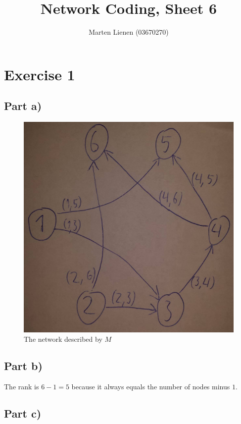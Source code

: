 \documentclass[10pt,a4paper]{article}
\title{Network Coding, Sheet 6}
\author{Marten Lienen (03670270)}
\begin{document}
\maketitle

\section*{Exercise 1}

\subsection*{Part a)}

\begin{figure}[h]
  \centering
  \includegraphics[width=\textwidth]{sheet-6/exercise-1-a}
  \caption{The network described by $M$}
\end{figure}

\subsection*{Part b)}

The rank is $6 - 1 = 5$ because it always equals the number of nodes minus $1$.

\subsection*{Part c)}
\end{document}
